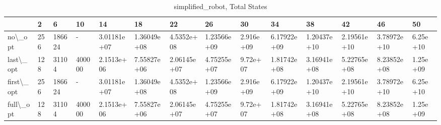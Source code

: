 \begin{table}
\centering
\caption{simplified\_robot, Total States}
\label{simplified_robot_total}
\begin{tabular}{llllllllllllll}
\toprule
{} &    2 &       6 &      10 &           14 &           18 &           22 &           26 &         30 &           34 &           38 &           42 &           46 &        50 \\
\midrule
no\textbackslash \_opt    &  256 &  186624 &       - &  3.01181e+07 &  1.36049e+08 &   4.5352e+08 &  1.23566e+09 &  2.916e+09 &  6.17922e+09 &  1.20437e+10 &  2.19561e+10 &  3.78972e+10 &  6.25e+10 \\
last\textbackslash \_opt  &  128 &   31104 &  400000 &   2.1513e+06 &  7.55827e+06 &  2.06145e+07 &  4.75255e+07 &   9.72e+07 &  1.81742e+08 &  3.16941e+08 &  5.22765e+08 &  8.23852e+08 &  1.25e+09 \\
first\textbackslash \_opt &  256 &  186624 &       - &  3.01181e+07 &  1.36049e+08 &   4.5352e+08 &  1.23566e+09 &  2.916e+09 &  6.17922e+09 &  1.20437e+10 &  2.19561e+10 &  3.78972e+10 &  6.25e+10 \\
full\textbackslash \_opt  &  128 &   31104 &  400000 &   2.1513e+06 &  7.55827e+06 &  2.06145e+07 &  4.75255e+07 &   9.72e+07 &  1.81742e+08 &  3.16941e+08 &  5.22765e+08 &  8.23852e+08 &  1.25e+09 \\
\bottomrule
\end{tabular}
\end{table}
